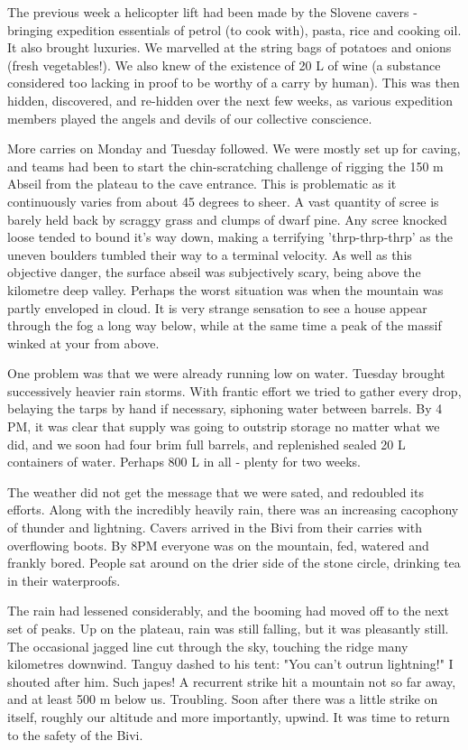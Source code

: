 The previous week a helicopter lift had been made by the Slovene cavers - bringing expedition essentials of petrol (to cook with), pasta, rice and cooking oil. It also brought luxuries. We marvelled at the string bags of potatoes and onions (fresh vegetables!). We also knew of the existence of 20 L of wine (a substance considered too lacking in proof to be worthy of a carry by human). This was then hidden, discovered, and re-hidden over the next few weeks, as various expedition members played the angels and devils of our collective conscience. 

More carries on Monday and Tuesday followed. We were mostly set up for caving, and teams had been to start the chin-scratching challenge of rigging the 150 m Abseil from the plateau to the cave entrance. This is problematic as it continuously varies from about 45 degrees to sheer. A vast quantity of scree is barely held back by scraggy grass and clumps of dwarf pine. Any scree knocked loose tended to bound it's way down, making a terrifying 'thrp-thrp-thrp' as the uneven boulders tumbled their way to a terminal velocity. As well as this objective danger, the surface abseil was subjectively scary, being above the kilometre deep  valley. Perhaps the worst situation was when the mountain was partly enveloped in cloud. It is very strange sensation to see a house appear through the fog a long way below, while at the same time a peak of the  massif winked at your from above. 

One problem was that we were already running low on water. Tuesday brought successively heavier rain storms. With frantic effort we tried to gather every drop, belaying the tarps by hand if necessary, siphoning water between barrels. By 4 PM, it was clear that supply was going to outstrip storage no matter what we did, and we soon had four brim full barrels, and replenished sealed 20 L containers of water. Perhaps 800 L in all - plenty for two weeks. 

The weather did not get the message that we were sated, and redoubled its efforts. Along with the incredibly heavily rain, there was an increasing cacophony of thunder and lightning. Cavers arrived in the Bivi from their carries with overflowing boots. By 8PM everyone was on the mountain, fed, watered and frankly bored. People sat around on the drier side of the stone circle, drinking tea in their waterproofs. 

The rain had lessened considerably, and the booming had moved off to the next set of peaks. Up on the plateau, rain was still falling, but it was pleasantly still. The occasional jagged line cut through the sky, touching the ridge many kilometres downwind. Tanguy dashed to his tent: "You can't outrun lightning!" I shouted after him. Such japes! A recurrent strike hit a mountain not so far away, and at least 500 m below us. Troubling. Soon after there was a little strike on  itself, roughly our altitude and more importantly, upwind. It was time to return to the safety of the Bivi.

